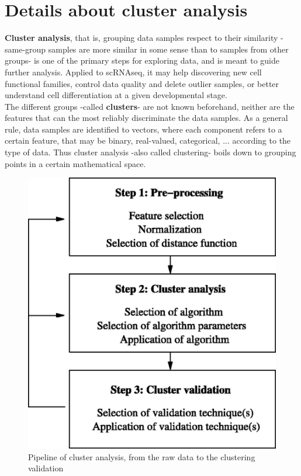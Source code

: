 \documentclass{report}
\begin{document}
\chapter{Details about cluster analysis}

\textbf{Cluster analysis}, that is, grouping data samples respect to their similarity -same-group samples are more similar in some sense than to samples from other groups- is one of the primary steps for exploring data, and is meant to guide further analysis. Applied to scRNAseq, it may help discovering new cell functional families\cite{jiang2016giniclust}, control data quality\cite{mccarthy2016scater} and delete outlier samples\cite{kiselev2016sc3}, or better understand cell differentiation at a given developmental stage\cite{goolam2016heterogeneity}.\\

The different groups -called \textbf{clusters}- are not known beforehand, neither are the features that can the most reliably discriminate the data samples. As a general rule, data samples are identified to vectors, where each component refers to a certain feature, that may be binary, real-valued, categorical, ... according to the type of data. Thus cluster analysis -also called clustering- boils down to grouping points in a certain mathematical space.\\

\begin{figure}[H]
\centering
\includegraphics[scale=0.15]{illustrations/clusteranalysis.jpg}
\caption{Pipeline of cluster analysis, from the raw data to the clustering validation}
\label{clusteranalysis}
\end{figure}
\end{document}
